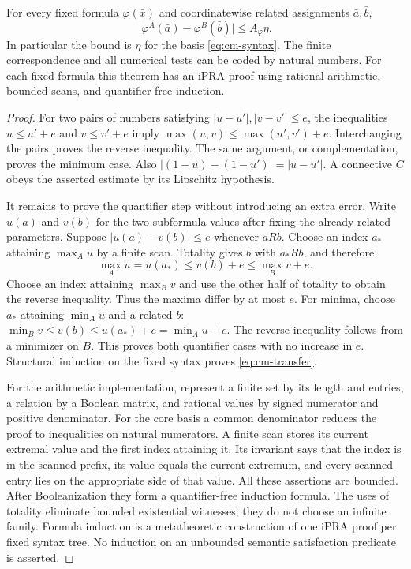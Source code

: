 \begin{theorem}
\label{thm:cm-transfer}
For every fixed formula $\varphi(\bar x)$ and coordinatewise related
assignments $\bar a,\bar b$,
\begin{equation}
 \bigl|\varphi^A(\bar a)-\varphi^B(\bar b)\bigr|
 \leq A_\varphi\eta.
 \label{eq:cm-transfer}
\end{equation}
In particular the bound is $\eta$ for the basis
\eqref{eq:cm-syntax}. The finite correspondence and all numerical tests
can be coded by natural numbers. For each fixed formula this theorem
has an iPRA proof using rational arithmetic, bounded scans, and
quantifier-free induction.
\end{theorem}

\begin{proof}
For two pairs of numbers satisfying $|u-u'|,|v-v'|\leq e$, the inequalities
$u\leq u'+e$ and $v\leq v'+e$ imply
$\max(u,v)\leq\max(u',v')+e$. Interchanging the pairs proves the
reverse inequality. The same argument, or complementation, proves the
minimum case. Also
$|(1-u)-(1-u')|=|u-u'|$. A connective $C$ obeys the asserted estimate by
its Lipschitz hypothesis.

It remains to prove the quantifier step without introducing an extra
error. Write $u(a)$ and $v(b)$ for the two subformula values after fixing
the already related parameters. Suppose $|u(a)-v(b)|\leq e$ whenever
$aRb$. Choose an index $a_*$ attaining $\max_Au$ by a finite scan.
Totality gives $b$ with $a_*Rb$, and therefore
\[
 \max_Au=u(a_*)\leq v(b)+e\leq\max_Bv+e.
\]
Choose an index attaining $\max_Bv$ and use the other half of totality
to obtain the reverse inequality. Thus the maxima differ by at most
$e$. For minima, choose $a_*$ attaining $\min_Au$ and a related $b$:
$\min_Bv\leq v(b)\leq u(a_*)+e=\min_Au+e$.
The reverse inequality follows from a minimizer on $B$.
This proves both quantifier cases with no increase in $e$.
Structural induction on the fixed syntax proves
\eqref{eq:cm-transfer}.

For the arithmetic implementation, represent a finite set by its length
and entries, a relation by a Boolean matrix, and rational values by
signed numerator and positive denominator. For the core basis a common
denominator reduces the proof to inequalities on natural numerators.
A finite scan stores its current extremal value and the first index
attaining it. Its invariant says that the index is in the scanned prefix,
its value equals the current extremum, and every scanned entry lies on
the appropriate side of that value. All these assertions are bounded.
After Booleanization they form a quantifier-free induction formula.
The uses of totality eliminate bounded existential witnesses; they do
not choose an infinite family.
Formula induction is a metatheoretic construction of one iPRA proof per
fixed syntax tree. No induction on an unbounded semantic satisfaction
predicate is asserted.
\end{proof}

